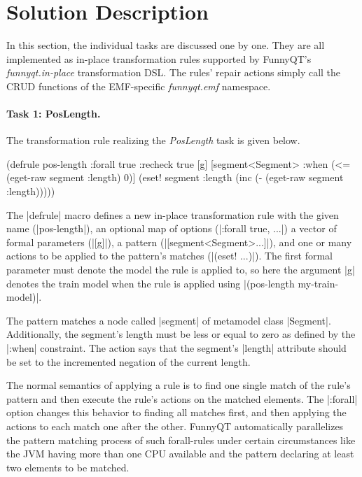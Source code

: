 \documentclass[submission]{eptcs}
\newcommand{\code}{\clojureinline}
\begin{document}
\section{Solution Description}
\label{sec:solution-description}

In this section, the individual tasks are discussed one by one.  They are all
implemented as in-place transformation rules supported by FunnyQT's
\emph{funnyqt.in-place} transformation DSL.  The rules' repair actions simply
call the CRUD functions of the EMF-specific \emph{funnyqt.emf} namespace.

\paragraph{Task 1: PosLength.}

The transformation rule realizing the \emph{PosLength} task is given below.

\begin{clojurecode}
(defrule pos-length {:forall true :recheck true} [g]
  [segment<Segment>
   :when (<= (eget-raw segment :length) 0)]
  (eset! segment :length (inc (- (eget-raw segment :length)))))
\end{clojurecode}

The \code|defrule| macro defines a new in-place transformation rule with the
given name (\code|pos-length|), an optional map of options
(\code|{:forall true, ...}|) a vector of formal parameters (\code|[g]|), a
pattern (\code|[segment<Segment>...]|), and one or many actions to be applied
to the pattern's matches (\code|(eset! ...)|).  The first formal parameter must
denote the model the rule is applied to, so here the argument \code|g| denotes
the train model when the rule is applied using
\code|(pos-length my-train-model)|.

The pattern matches a node called \code|segment| of metamodel class
\code|Segment|.  Additionally, the segment's length must be less or equal to
zero as defined by the \code|:when| constraint.  The action says that the
segment's \code|length| attribute should be set to the incremented negation of
the current length.

The normal semantics of applying a rule is to find one single match of the
rule's pattern and then execute the rule's actions on the matched elements.
The \code|:forall| option changes this behavior to finding all matches first,
and then applying the actions to each match one after the other.  FunnyQT
automatically parallelizes the pattern matching process of such forall-rules
under certain circumstances like the JVM having more than one CPU available and
the pattern declaring at least two elements to be matched.
\end{document}
